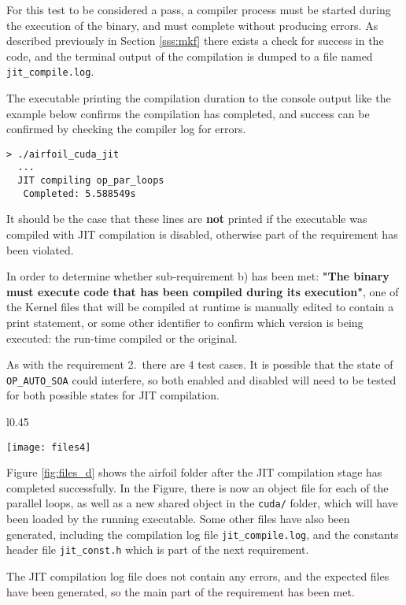 \label{sss:jit_comp}
For this test to be considered a pass, a compiler process must be started during the execution of the binary, and must complete without producing errors. As described previously in Section \ref{sss:mkf} there exists a check for success in the code, and the terminal output of the compilation is dumped to a file named \verb|jit_compile.log|.
\par
The executable printing the compilation duration to the console output like the example below confirms the compilation has completed, and success can be confirmed by checking the compiler log for errors.
\begin{verbatim}
> ./airfoil_cuda_jit
  ...
  JIT compiling op_par_loops
   Completed: 5.588549s
\end{verbatim}
It should be the case that these lines are \textbf{not} printed if the executable was compiled with JIT compilation is disabled, otherwise part of the requirement has been violated.\par
In order to determine whether sub-requirement b) has been met: \textbf{"The binary must execute code that has been compiled during its execution"}, one of the Kernel files that will be compiled at runtime is manually edited to contain a print statement, or some other identifier to confirm which version is being executed: the run-time compiled or the original.\par
As with the requirement 2.\ there are 4 test cases. It is possible that the state of \verb|OP_AUTO_SOA| could interfere, so both enabled and disabled will need to be tested for both possible states for JIT compilation.
\clearpage
\begin{wrapfigure}[21]{l}{0.45\textwidth}
\caption{\textit{airfoil} folder after Just-In-Time Compilation}
\label{fig:files_d}
\texttt{[image: files4]}
\end{wrapfigure}
Figure \ref{fig:files_d} shows the airfoil folder after the JIT compilation stage has completed successfully. In the Figure, there is now an object file for each of the parallel loops, as well as a new shared object in the \verb|cuda/| folder, which will have been loaded by the running executable. Some other files have also been generated, including the compilation log file \verb|jit_compile.log|, and the constants header file \verb|jit_const.h| which is part of the next requirement.
\par
The JIT compilation log file does not contain any errors, and the expected files have been generated, so the main part of the requirement has been met.
